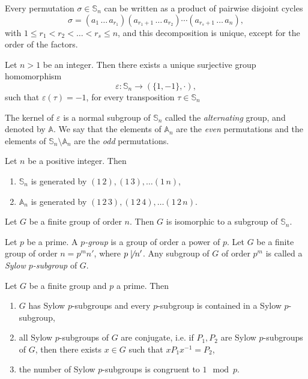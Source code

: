\begin{theorem}
    Every permutation $\sigma\in\mathbb{S}_n$ can be written as a product of pairwise disjoint cycles
    \[ \sigma=(a_1\,\dots\, a_{r_1})(a_{r_1+1}\,\dots\, a_{r_2})\cdots (a_{r_s+1}\,\dots\, a_n),\]
    with $1\leq r_1<r_2<\dots<r_s\leq n$, and this decomposition is unique, except for the order of the factors.
\end{theorem}

\begin{theorem}
    Let $n>1$ be an integer. Then there exists a unique surjective group homomorphism 
    \[ \varepsilon\colon \mathbb{S}_n\rightarrow (\{ 1,-1\},\cdot),\]
    such that $\varepsilon(\tau)=-1$, for every transposition $\tau\in\mathbb{S}_n$
\end{theorem}

The kernel of $\varepsilon$ is a normal subgroup of $\mathbb{S}_n$ called the {\em alternating} group, and denoted by $\mathbb{A}$.
We say that the elements of $\mathbb{A}_n$ are the {\em even} permutations and the elements of $\mathbb{S}_n\setminus\mathbb{A}_n$
are the {\em odd} permutations.

\begin{theorem}
Let $n$ be a positive integer. Then    
\begin{enumerate}
    \item $\mathbb{S}_n$ is generated by $(1\, 2),(1\, 3),\dots (1\, n)$,
    \item $\mathbb{A}_n$ is generated by $(1\, 2\, 3),(1\, 2\, 4),\dots (1\, 2\, n)$.
    \end{enumerate}
\end{theorem}

\begin{theorem}
    Let $G$ be a finite group of order $n$. Then $G$ is isomorphic to a subgroup of $\mathbb{S}_n$.
\end{theorem}

Let $p$ be a prime. A {\em $p$-group} is a group of order a power of $p$. Let $G$ be a finite group of order
$n=p^mn'$, where $p\not\mid n'$. Any subgroup of $G$ of order $p^m$ is called a {\em Sylow $p$-subgroup} of $G$.

\begin{theorem}[Sylow]
    Let $G$ be a finite group and $p$ a prime. Then
    \begin{enumerate}
        \item $G$ has Sylow $p$-subgroups and every $p$-subgroup is contained in a Sylow $p$-subgroup,
        \item all Sylow $p$-subgroups of $G$ are conjugate, i.e. if $P_1,P_2$ are Sylow $p$-subgroups of $G$, 
        then there exists $x\in G$ such that $xP_1x^{-1}=P_2$,
        \item the number of Sylow $p$-subgroups is congruent to $1\mod p$.
    \end{enumerate}
\end{theorem}

